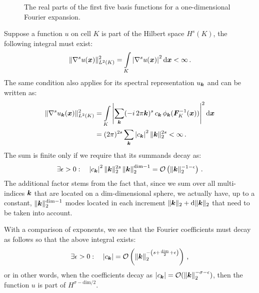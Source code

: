 \begin{figure}
\centering

\caption[The first basis functions for a Fourier expansion.]{The real parts of the first five basis functions for a one-dimensional Fourier expansion.}
\label{fig:fourier}
\end{figure}

Suppose a function $u$ on cell $K$ is part of the Hilbert space $H^s(K)$, the following integral must exist:
\begin{align}
\| \nabla^s u(\vec{x}) \|_{L^2(K)}^2 = \int\limits_K \left| \nabla^s u(\vec{x}) \right|^2 \differential{\vec{x}} < \infty \,\text{.}
\end{align}
The same condition also applies for its spectral representation $u_{\tuple{k}}$ and can be written as:
\begin{align}
\| \nabla^s u_{\tuple{k}}(\vec{x}) \|_{L^2(K)}^2 &= \int\limits_K \left| \sum\limits_{\tuple{k}} (-i \, 2 \pi \tuple{k})^s \, c_\tuple{k} \, \phi_\tuple{k}(\mat{F}_K^{-1}(\vec{x})) \right|^2 \differential{\vec{x}} \\
&= (2 \pi)^{2s} \sum\limits_{\tuple{k}} \left| c_\tuple{k} \right|^2 \|\tuple{k}\|_2^{2s} < \infty \,\text{.}
\end{align}
The sum is finite only if we require that its summands decay as:
\begin{align}
\exists \epsilon > 0 : \quad \left| c_\tuple{k} \right|^2 \|\tuple{k}\|_2^{2s} \left\| \tuple{k} \right\|_2^{\text{dim} - 1} = \mathcal{O}\left( \|\tuple{k}\|_2^{-1-\epsilon} \right) \,\text{.}
\end{align}
The additional factor stems from the fact that, since we sum over all multi-indices $\tuple{k}$ that are located on a dim-dimensional sphere, we actually have, up to a constant, $\|\tuple{k}\|_2^{\text{dim}-1}$ modes located in each increment $\|\tuple{k}\|_2 + \differential{\|\tuple{k}\|_2}$ that need to be taken into account. \textcite{dealiistep-27}

With a comparison of exponents, we see that the Fourier coefficients must decay as follows so that the above integral exists:
\begin{align}
\exists \epsilon > 0 : \quad |c_\tuple{k}| = \mathcal{O}\left( \left\|\tuple{k}\right\|_2^{-\left(s + \frac{\text{dim}}{2} + \epsilon \right)} \right) \,\text{,}
\end{align}
or in other words, when the coefficients decay as $\left| c_\tuple{k} \right| = \mathcal{O}( \left\|\tuple{k}\right\|_2^{-\sigma-\epsilon} )$, then the function $u$ is part of $H^{\sigma - \text{dim}/2}$. \textcite{dealiistep-27}

